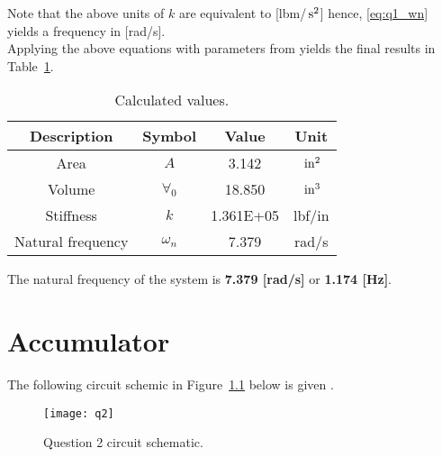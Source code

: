 Note that the above units of $k$ are equivalent to [lbm/$\,\mathrm{s^2}$] hence, \ref{eq:q1_wn} yields a frequency in [rad/s].\\

Applying the above equations with parameters from \cite{assign} yields the final results in Table~\ref{tab:q1_ans}.
 
\begin{table}[H]
  \centering
  \caption{Calculated values.}
    \begin{tabular}{cccc}
    \toprule    
    \textbf{Description} & \textbf{Symbol} & \textbf{Value } & \textbf{Unit} \\
    \midrule
    Area  & $A$   & 3.142 & $\,\mathrm{in^2}$ \\
    Volume & $\forall_0$ & 18.850 & $\,\mathrm{in^3}$ \\
    Stiffness & $k$   & 1.361E+05 & lbf/in \\
    Natural frequency & $\omega_n$ & 7.379 & rad/s\\
	\bottomrule    
    \end{tabular}
  \label{tab:q1_ans}
\end{table}

The natural frequency of the system is \textbf{7.379 [rad/s]} or \textbf{1.174 [Hz]}.

\chapter{Accumulator}
\label{chap:q2}

The following circuit schemic in Figure~\ref{fig:q2} below is given \cite{assign}.

\begin{figure}[H]
	\centering
	\texttt{[image: q2]}
	\caption{Question 2 circuit schematic.}
	\label{fig:q2}
\end{figure}

